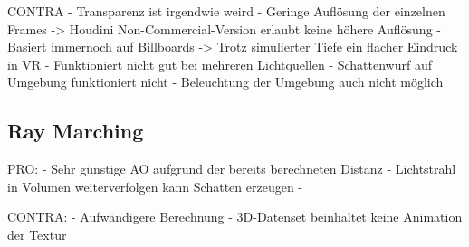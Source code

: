 CONTRA\newline
- Transparenz ist irgendwie weird\newline
- Geringe Auflösung der einzelnen Frames \newline
 -> Houdini Non-Commercial-Version erlaubt keine höhere Auflösung\newline
- Basiert immernoch auf Billboards\newline
 -> Trotz simulierter Tiefe ein flacher Eindruck in VR\newline
- Funktioniert nicht gut bei mehreren Lichtquellen\newline
- Schattenwurf auf Umgebung funktioniert nicht\newline
- Beleuchtung der  Umgebung auch nicht möglich\newline




\subsection{Ray Marching}
\label{sec:5.2}

PRO: \newline
- Sehr günstige AO aufgrund der bereits berechneten Distanz\newline
- Lichtstrahl in Volumen weiterverfolgen kann Schatten erzeugen\newline
- 

CONTRA: \newline
- Aufwändigere Berechnung\newline
- 3D-Datenset beinhaltet keine Animation der Textur\newline